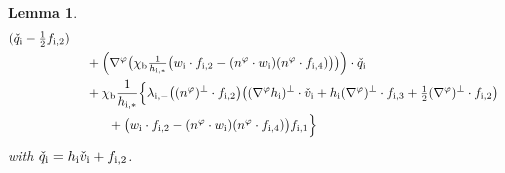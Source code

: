 \documentclass[10pt]{amsart}
\newtheorem{lemma}[theorem]{Lemma}
\theoremstyle{definition}
\begin{document}
\begin{lemma}
\begin{align*}
(\check{q}_\mathrm{i}-\tfrac12f_{{\rm i},2}) \\
&\quad\;
+ \Bigl(\nabla^\varphi\bigl(\chi_\mathrm{b}\tfrac{1}{h_{{\rm i},*}}
\bigl(w_\mathrm{i}\cdot f_{{\rm i},2}-(n^\varphi\cdot w_\mathrm{i})(n^\varphi\cdot f_{{\rm i},4}) \bigr) \bigr) \Bigr)\cdot\check{q}_\mathrm{i} \\
&\quad\;
+ \chi_\mathrm{b}\frac{1}{h_{{\rm i},*}}\Bigl\{
\lambda_{{\rm i},-}\bigl((n^\varphi)^\perp\cdot f_{{\rm i},2}\bigr)\bigl((\nabla^\varphi h_\mathrm{i})^\perp\cdot\check{v}_\mathrm{i}
+ h_\mathrm{i}(\nabla^\varphi)^\perp\cdot f_{{\rm i},3} + \tfrac12(\nabla^\varphi)^\perp\cdot f_{{\rm i},2} \bigr) \\
&\makebox[3em]{}
+ \bigl(w_\mathrm{i}\cdot f_{{\rm i},2}-(n^\varphi\cdot w_\mathrm{i})(n^\varphi\cdot f_{{\rm i},4}) \bigr)f_{{\rm i},1} \Bigr\}
\end{align*}
with $\check{q}_\mathrm{i}=h_\mathrm{i}\check{v}_\mathrm{i}+f_{{\rm i},2}$.
\end{lemma}
\end{document}
